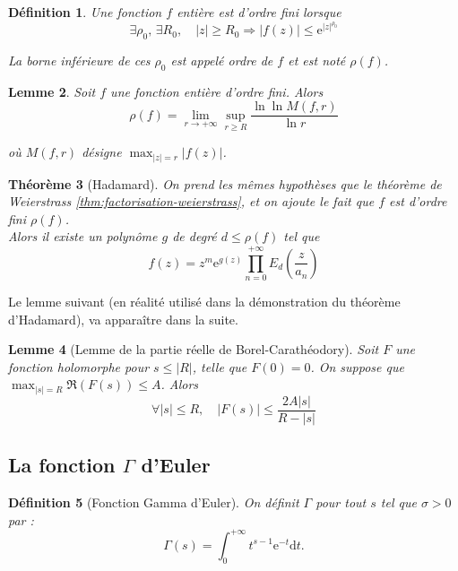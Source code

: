 \documentclass[french]{report}
\newtheorem{theorem}{Théorème}[section]
\newtheorem{definition}[theorem]{Définition}
\newtheorem{lemma}[theorem]{Lemme}
\begin{document}
\begin{definition}
  Une fonction $f$ entière est d'ordre fini lorsque
  \[
   \exists \rho_0,\,\exists R_0,\quad
   |z|\geq R_0\Longrightarrow|f(z)|\leq\mathrm{e}^{|z|^{\rho_0}}
  \]

  La borne inférieure de ces $\rho_0$ est appelé ordre de $f$ et est noté $\rho(f)$.
\end{definition}

\begin{lemma}
  Soit $f$ une fonction entière d'ordre fini. Alors
  \[
    \rho(f)=\lim_{r\to+\infty}\sup_{r\geq R}
    \frac{\ln\ln M(f,r)}{\ln r}
  \]

  où $M(f,r)$ désigne $\max_{|z|=r}|f(z)|$.
\end{lemma}

\begin{theorem}[Hadamard]\label{thm:factorisation-hadamard}
  On prend les mêmes hypothèses que le théorème de Weierstrass \ref{thm:factorisation-weierstrass}, et on ajoute le fait que $f$ est d'ordre fini $\rho(f)$.
  \\
  Alors il existe un polynôme $g$ de degré $d\leq \rho(f)$ tel que
  \[
    f(z)=z^m\mathrm{e}^{g(z)}\prod_{n=0}^{+\infty}E_d\left(\frac{z}{a_n}\right)
  \]
\end{theorem}

Le lemme suivant (en réalité utilisé dans la démonstration du théorème d'Hadamard), va apparaître dans la suite.

\begin{lemma}[Lemme de la partie réelle de Borel-Carathéodory]\label{lem:borel-caratheodory}
  Soit $F$ une fonction holomorphe pour $s\leq|R|$, telle que $F(0)=0$. On suppose que $\max_{|s|=R}\Re(F(s))\leq A$. Alors
  \[
    \forall |s|\leq R,\quad|F(s)|\leq\frac{2A|s|}{R-|s|}  
  \]
\end{lemma}

\subsection{La fonction $\Gamma$ d'Euler}

\begin{definition}[Fonction Gamma d'Euler]
  On définit $\Gamma$ pour tout $s$ tel que $\sigma>0$ par :
  \[
    \Gamma(s)=\int_0^{+\infty}t^{s-1}\mathrm{e}^{-t}\mathrm{d}t.
  \]
\end{definition}
\end{document}
